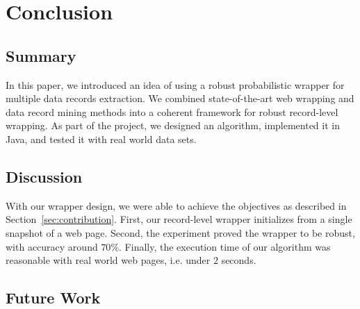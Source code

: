 \chapter{Conclusion}

\section{Summary}

In this paper, we introduced an idea of using a robust probabilistic wrapper for multiple data records extraction. We combined state-of-the-art web wrapping and data record mining methods into a coherent framework for robust record-level wrapping. As part of the project, we designed an algorithm, implemented it in Java, and tested it with real world data sets.


\section{Discussion}

With our wrapper design, we were able to achieve the objectives as described in Section~\ref{sec:contribution}. First, our record-level wrapper initializes from a single snapshot of a web page. Second, the experiment proved the wrapper to be robust, with accuracy around $70\%$. Finally, the execution time of our algorithm was reasonable with real world web pages, i.e. under $2$ seconds.



\section{Future Work}
\label{sec:future-work}

